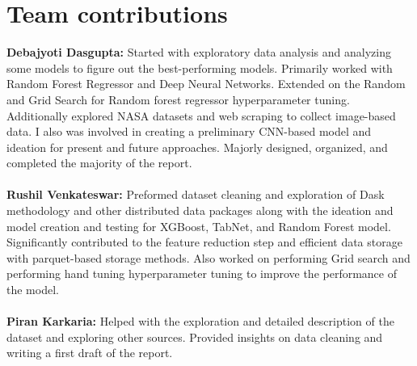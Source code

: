 \documentclass{article}
\begin{document}
\section{Team contributions}
\textbf{Debajyoti Dasgupta:} Started with exploratory data analysis and analyzing some models to figure out the best-performing models. Primarily worked with Random Forest Regressor and Deep Neural Networks. Extended on the Random and Grid Search for Random forest regressor hyperparameter tuning. Additionally explored NASA datasets and web scraping to collect image-based data. I also was involved in creating a preliminary CNN-based model and ideation for present and future approaches. Majorly designed, organized, and completed the majority of the report.\\
\\
\textbf{Rushil Venkateswar:} Preformed dataset cleaning and exploration of Dask methodology and other distributed data packages along with the ideation and model creation and testing for XGBoost, TabNet, and Random Forest model. Significantly contributed to the feature reduction step and efficient data storage with parquet-based storage methods. Also worked on performing Grid search and performing hand tuning hyperparameter tuning to improve the performance of the model.\\
\\
\textbf{Piran Karkaria:} Helped with the exploration and detailed description of the dataset and exploring other sources. Provided insights on data cleaning and writing a first draft of the report.


\end{document}
